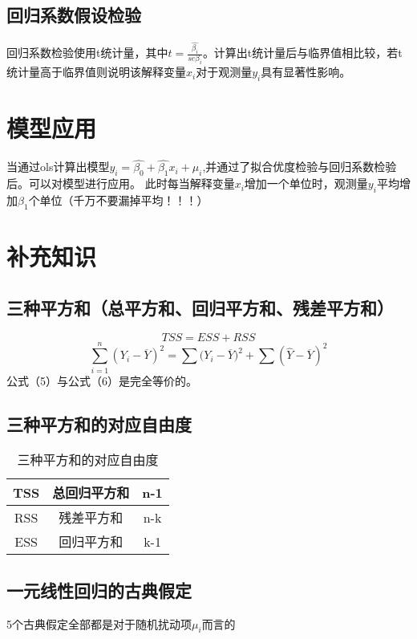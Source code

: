 \documentclass[a4paper，UTF8]{article}
\begin{document}
\subsection{回归系数假设检验}
回归系数检验使用t统计量，其中$t = \frac{\hat{\beta_i}}{se\beta_i}$。计算出t统计量后与临界值相比较，若t统计量高于临界值则说明该解释变量$x_i$对于观测量$y_i$具有显著性影响。 
\section{模型应用}
当通过ols计算出模型$y_i = \hat{\beta_0}+\hat{\beta_1}x_i + \mu_i$,并通过了拟合优度检验与回归系数检验后。可以对模型进行应用。
此时每当解释变量$x_i$增加一个单位时，观测量$y_i$平均增加$\beta_1$个单位（千万不要漏掉平均！！！）
\section{补充知识}

\subsection{三种平方和（总平方和、回归平方和、残差平方和）} 
\begin{equation}
TSS = ESS + RSS
\end{equation}
\begin{equation}
\sum_{i=1}^{n}(Y_i-\overline{Y})^{2} = \sum{(Y_i-\overline{Y}})^{2} + \sum(\hat{Y}-\overline{Y})^{2}
\end{equation}
公式（5）与公式（6）是完全等价的。
\subsection{三种平方和的对应自由度} 

\begin{table}[h]
\caption{三种平方和的对应自由度}
\centering
\begin{tabular}{|c|c|c|}
\hline
TSS & 总回归平方和 & n-1 \\
\hline
RSS & 残差平方和 & n-k \\
\hline
ESS & 回归平方和 & k-1 \\
\hline
\end{tabular}
\end{table}

\subsection{一元线性回归的古典假定}
5个古典假定全部都是对于随机扰动项$\mu_i$而言的
\end{document}
